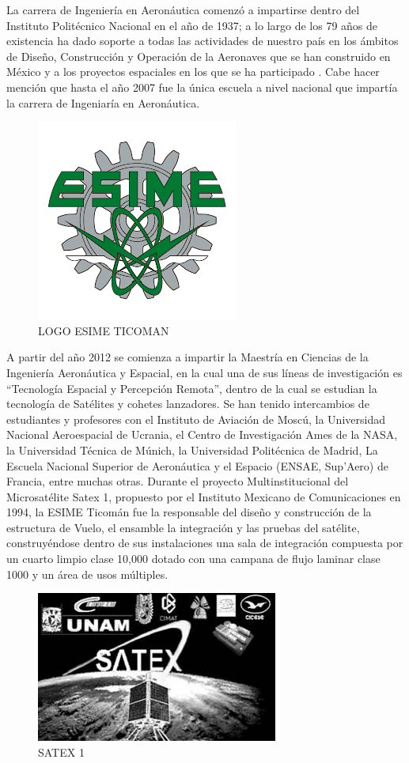 \documentclass[letterpaper,12pt]{article} %
\begin{document}
    La carrera de Ingeniería en Aeronáutica comenzó a impartirse dentro del Instituto Politécnico Nacional en el año de 1937; a lo largo de los 79 años de existencia ha dado soporte a todas las actividades de nuestro país en los ámbitos de Diseño, Construcción y Operación de la Aeronaves que se han construido en México y a los proyectos espaciales en los que se ha participado . Cabe hacer mención que hasta el año 2007 fue la única escuela a nivel nacional que impartía la carrera de Ingeniaría en Aeronáutica.

    \begin{figure}[H]
      \centerline{\includegraphics[width=.3\textwidth]{ESIME.png}}
      \caption{LOGO ESIME TICOMAN}
      \label{fig:ESIME2}
    \end{figure}
A partir del año 2012 se comienza a impartir la Maestría en Ciencias de la Ingeniería Aeronáutica y Espacial, en la cual una de sus líneas de investigación es “Tecnología Espacial y Percepción Remota”, dentro de la cual se estudian la tecnología de Satélites y  cohetes lanzadores.
Se han tenido intercambios de estudiantes y profesores con el Instituto de Aviación de Moscú, la Universidad Nacional Aeroespacial de Ucrania, el Centro de Investigación Ames de la NASA, la Universidad Técnica de Múnich, la Universidad Politécnica de Madrid, La Escuela Nacional Superior de Aeronáutica y el Espacio (ENSAE, Sup’Aero) de Francia, entre muchas otras.
Durante el proyecto Multinstitucional del Microsatélite Satex 1, propuesto por el Instituto Mexicano de Comunicaciones en 1994, la ESIME Ticomán fue la responsable del diseño y construcción de la estructura de Vuelo, el ensamble la integración y las pruebas del satélite, construyéndose dentro de sus instalaciones una sala de integración compuesta por un cuarto limpio clase 10,000 dotado con una campana de flujo laminar clase 1000 y un área de usos múltiples. 

\begin{figure}[H]
      \centerline{\includegraphics[width=.3\textwidth]{satex.jpeg}}
      \caption{SATEX 1}
      \label{fig:satex}
\end{figure}
\end{document}

